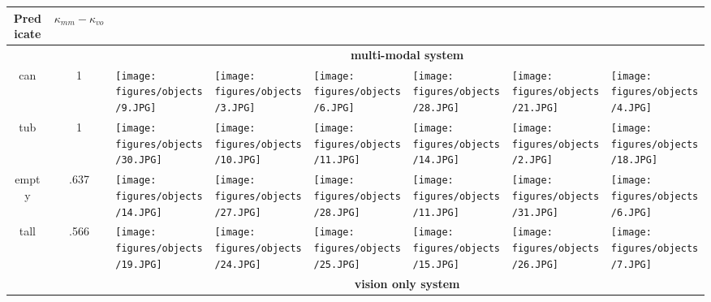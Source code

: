 \begin{table*}
\centering
\begin{tabular}[t]{| c | c || >{\centering\arraybackslash}m{\pictablew} | >{\centering\arraybackslash}m{\pictablew} | >{\centering\arraybackslash}m{\pictablew} || >{\centering\arraybackslash}m{\pictablew} | >{\centering\arraybackslash}m{\pictablew} | >{\centering\arraybackslash}m{\pictablew} |}
	\hline
	\bf Predicate & $\kappa_{mm}-\kappa_{vo}$ & \multicolumn{3}{c||}{\bf High Confidence Positive} & \multicolumn{3}{c|}{\bf High Confidence Negative} \\ \hline \hline
	\multicolumn{2}{|c|}{} & \multicolumn{6}{c|}{\bf multi-modal system} \\ \hline
	can & 1 & \texttt{[image: figures/objects/9.JPG]} & \texttt{[image: figures/objects/3.JPG]} & \texttt{[image: figures/objects/6.JPG]} & \texttt{[image: figures/objects/28.JPG]} & \texttt{[image: figures/objects/21.JPG]} & \texttt{[image: figures/objects/4.JPG]}\\ \hline
	tub & 1 & \texttt{[image: figures/objects/30.JPG]} & \texttt{[image: figures/objects/10.JPG]} & \texttt{[image: figures/objects/11.JPG]} & \texttt{[image: figures/objects/14.JPG]} & \texttt{[image: figures/objects/2.JPG]} & \texttt{[image: figures/objects/18.JPG]}\\ \hline
	empty & .637 & \texttt{[image: figures/objects/14.JPG]} & \texttt{[image: figures/objects/27.JPG]} & \texttt{[image: figures/objects/28.JPG]} & \texttt{[image: figures/objects/11.JPG]} & \texttt{[image: figures/objects/31.JPG]} & \texttt{[image: figures/objects/6.JPG]}\\ \hline
	tall & .566 & \texttt{[image: figures/objects/19.JPG]} & \texttt{[image: figures/objects/24.JPG]} & \texttt{[image: figures/objects/25.JPG]} & \texttt{[image: figures/objects/15.JPG]} & \texttt{[image: figures/objects/26.JPG]} & \texttt{[image: figures/objects/7.JPG]}\\ \hline
	\multicolumn{2}{|c|}{} & \multicolumn{6}{c|}{\bf vision only system} \\ \hline

\end{tabular}
\end{table*}

